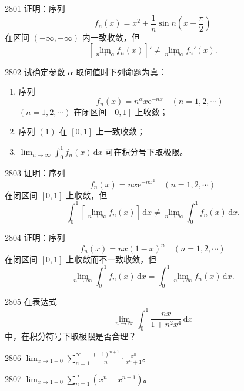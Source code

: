 \begin{prob}[M]{2801}
证明：序列
\[
f_n(x) = x^2 + \frac{1}{n}\sin n\left(x + \frac{\pi}{2}\right)
\]
在区间 $(-\infty, +\infty)$ 内一致收敛，但
\[
\left[ \lim_{n\to\infty} f_n(x) \right]' \neq \lim_{n\to\infty} f_n'(x).
\]
\end{prob}

\begin{prob}[L]{2802}
试确定参数 $\alpha$ 取何值时下列命题为真：
\begin{enumerate}[label=(\alph*), itemsep=2pt, topsep=3pt]
  \item 序列
  \[
  f_n(x) = n^\alpha x \mathrm{e}^{-nx} \quad (n=1,2,\cdots) \tag{1}
  \]
  $(n=1,2,\cdots)$ 在闭区间 $[0,1]$ 上收敛；
  \item 序列 $(1)$ 在 $[0,1]$ 上一致收敛；
  \item $\displaystyle\lim_{n\to\infty} \int_0^1 f_n(x)\,\mathrm{d}x$ 可在积分号下取极限。
\end{enumerate}
\end{prob}

\begin{prob}[M]{2803}
证明：序列
\[
f_n(x) = nx\mathrm{e}^{-nx^2} \quad (n=1,2,\cdots)
\]
在闭区间 $[0,1]$ 上收敛，但
\[
\int_0^1 \left[ \lim_{n\to\infty} f_n(x) \right]\,\mathrm{d}x \neq \lim_{n\to\infty} \int_0^1 f_n(x)\,\mathrm{d}x.
\]
\end{prob}

\begin{prob}[M]{2804}
证明：序列
\[
f_n(x) = nx(1-x)^n \quad (n=1,2,\cdots)
\]
在闭区间 $[0,1]$ 上收敛而不一致收敛，但
\[
\lim_{n\to\infty} \int_0^1 f_n(x)\,\mathrm{d}x = \int_0^1 \lim_{n\to\infty} f_n(x)\,\mathrm{d}x.
\]
\end{prob}

\begin{prob}[M]{2805}
在表达式
\[
\lim_{n\to\infty} \int_0^1 \frac{nx}{1 + n^2 x^4}\,\mathrm{d}x
\]
中，在积分符号下取极限是否合理？
\end{prob}


\begin{prob}[S]{2806}
$\displaystyle\lim_{x\to 1-0} \sum_{n=1}^{\infty} \frac{(-1)^{n+1}}{n} \cdot \frac{x^n}{x^n + 1}$。
\end{prob}

\begin{prob}[S]{2807}
$\displaystyle\lim_{x\to 1-0} \sum_{n=1}^{\infty} (x^n - x^{n+1})$。
\end{prob}

